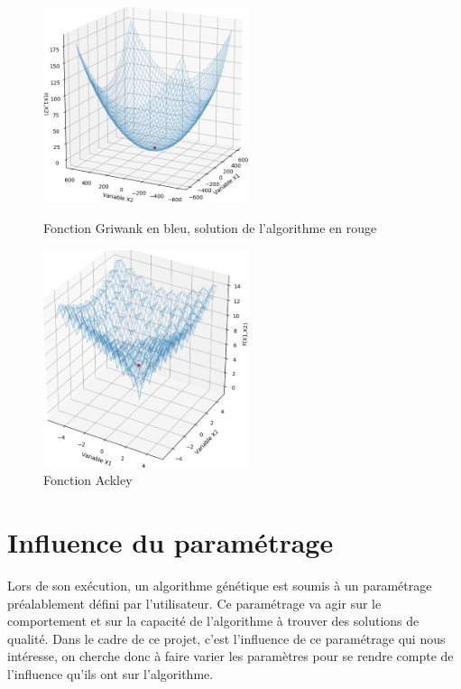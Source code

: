 \documentclass[12pt]{report}
\begin{document}
      \begin{figure}[h]
        \begin{minipage}[c]{.46\linewidth}
            \centering
            \includegraphics[width=6cm]{img/3,2.png}
            \caption{Fonction Griwank \cite{wiki5} en bleu, solution de l'algorithme en rouge}
            \label{ex_r2}
        \end{minipage}
        \hfill%
        \begin{minipage}[c]{.46\linewidth}
            \centering
            \includegraphics[width=6cm]{img/ackley.png}
            \caption{Fonction Ackley \cite{wiki5}}
            \label{ackley}
        \end{minipage}
      \end{figure}

    \section{Influence du paramétrage }

      Lors de son exécution, un algorithme génétique est soumis à un paramétrage préalablement défini par l'utilisateur. Ce paramétrage va agir sur le comportement et sur la capacité de l'algorithme à trouver des solutions de qualité. Dans le cadre de ce projet, c'est  l'influence de ce paramétrage qui nous intéresse, on cherche donc à faire varier les paramètres pour se rendre compte de l'influence qu'ils ont sur l'algorithme.
\end{document}
